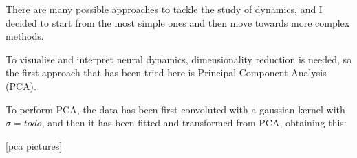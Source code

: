 There are many possible approaches to tackle the study of dynamics, and I decided to start from the most simple ones and then move towards more complex methods.

To visualise and interpret neural dynamics, dimensionality reduction is needed, so the first approach that has been tried here is Principal Component Analysis (PCA).

To perform PCA, the data has been first convoluted with a gaussian kernel with $\sigma=todo$, and then it has been fitted and transformed from PCA, obtaining this:

[pca pictures]






